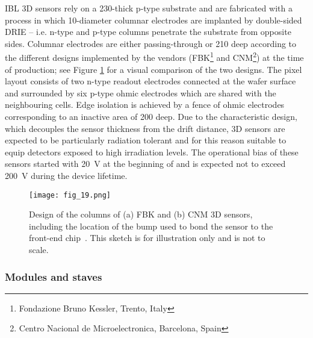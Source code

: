\documentclass[cernpreprint, atlasdraft=false, UKenglish,british,orcidlogo, texmf, orcidlogo]{atlasdoc}
\begin{document}
\gls{IBL} 3D sensors rely on a \SI{230}{\micron}-thick p-type substrate and are fabricated with a process in which \SI{10}{\micron}-diameter columnar electrodes are implanted by double-sided \gls{DRIE} -- i.e. n-type and p-type columns penetrate the substrate from opposite sides.
Columnar electrodes are either passing-through or \SI{210}{\micron} deep according to the different designs implemented by the vendors (FBK\footnote{Fondazione Bruno Kessler, Trento, Italy} and CNM\footnote{Centro Nacional de Microelectronica, Barcelona, Spain}) at the time of production; see Figure \ref{fig:ID-IBL_3D} for a visual comparison of the two designs.
The pixel layout consists of two n-type readout electrodes connected at the wafer surface and surrounded by six p-type ohmic electrodes  which are shared with the neighbouring cells. Edge isolation is achieved by a fence of ohmic electrodes corresponding to an inactive area of \SI{200}{\micron} deep.
Due to the characteristic design, which decouples the sensor thickness from the drift distance, 3D sensors are expected to be particularly radiation tolerant and for this reason suitable to equip detectors exposed to high irradiation levels.
The operational bias of these sensors started with \SI{20}{\V} at the beginning of \RunTwo and is expected not to exceed \SI{200}{\V} during the device lifetime.
 
\begin{figure}
\centering
\texttt{[image: fig\_19.png]}
\caption{Design of the columns of (a) FBK and (b) CNM 3D sensors, including the location of the bump used to bond the sensor to the front-end chip~\cite{PIX-2018-001}. This sketch is for illustration only and is not to scale. }
\label{fig:ID-IBL_3D}
\end{figure}
 
\subsubsection{Modules and staves}
\label{sec:ID-IBL-ModulesStaves}
 
\end{document}
